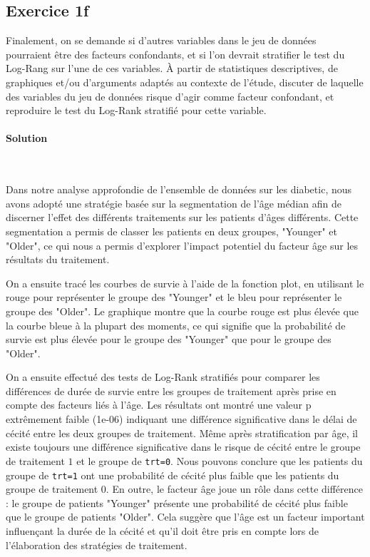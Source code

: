 \documentclass[../main.tex]{subfiles}
\begin{document}
\begin{CJK*}{UTF8}{gbsn}

\section*{Exercice 1f}
Finalement, on se demande si d'autres variables
dans le jeu de données pourraient être des facteurs confondants, et si l'on devrait stratifier le
test du Log-Rang sur l'une de ces variables. À partir de statistiques descriptives, de graphiques
et/ou d'arguments adaptés au contexte de l'étude, discuter de laquelle des variables du jeu de
données risque d'agir comme facteur confondant, et reproduire le test du Log-Rank stratifié pour cette variable.
    
\paragraph{Solution}\
    
Dans notre analyse approfondie de l'ensemble de données sur les diabetic, 
nous avons adopté une stratégie basée sur la segmentation de l'âge médian 
afin de discerner l'effet des différents traitements sur les patients d'âges différents. 
Cette segmentation a permis de classer les patients en deux groupes, "Younger" et "Older", 
ce qui nous a permis d'explorer l'impact potentiel du facteur âge sur les résultats du traitement.
    
On a ensuite tracé les courbes de survie à l'aide de la fonction plot, 
en utilisant le rouge pour représenter le groupe des "Younger" 
et le bleu pour représenter le groupe des "Older". 
Le graphique montre que la courbe rouge est plus élevée que la courbe bleue 
à la plupart des moments, ce qui signifie que la probabilité de survie est plus 
élevée pour le groupe des "Younger" que pour le groupe des "Older". 
    
On a ensuite effectué des tests de Log-Rank 
stratifiés pour comparer les différences de durée de survie 
entre les groupes de traitement après prise en compte des facteurs liés à l'âge.
Les résultats ont montré une valeur p extrêmement faible (1e-06) 
indiquant une différence significative dans le délai de cécité entre les deux groupes de traitement.
Même après stratification par âge, il existe toujours une différence 
significative dans le risque de cécité entre le groupe de traitement $1$
et le groupe de \texttt{trt=0}. Nous pouvons conclure que les patients 
du groupe de \texttt{trt=1} ont une probabilité de cécité plus faible que 
les patients du groupe de traitement $0$. 
En outre, le facteur âge joue un rôle dans cette différence : 
le groupe de patients "Younger"
présente une probabilité de cécité plus faible que le groupe de patients "Older". 
Cela suggère que l'âge est un facteur important influençant la durée 
de la cécité et qu'il doit être pris en compte lors de l'élaboration des stratégies de traitement.


\end{CJK*}
\end{document}

